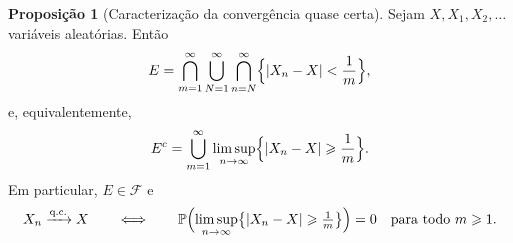 \documentclass[12pt,portuguese]{article}
\theoremstyle{definition}
\newtheorem{proposition}[proposition]{Proposição}
\theoremstyle{plainexercise}
\theoremstyle{starredexercise}
\theoremstyle{definition}
\begin{document}
\begin{proposition}[Caracterização da convergência quase certa]\label{prop:qc-caracterizacao}
Sejam $X,X_1,X_2,\ldots$ variáveis aleatórias. Então
\begin{equation}\label{eq:qc-conjunto}
E
=
\bigcap_{m=1}^{\infty}\bigcup_{N=1}^{\infty}\bigcap_{n=N}^{\infty}
\Bigl\{|X_n-X|<\frac{1}{m}\Bigr\},
\end{equation}
e, equivalentemente,
\begin{equation}\label{eq:qc-limsup}
E^c
=
\bigcup_{m=1}^{\infty}\limsup_{n\to\infty}
\Bigl\{|X_n-X|\geqslant\frac{1}{m}\Bigr\}.
\end{equation}
Em particular, $E\in\mathcal{F}$ e
\[
X_n\xrightarrow{\text{q.c.}}X
\qquad\Longleftrightarrow\qquad
\mathbb{P}\Bigl(\limsup_{n\to\infty}\bigl\{|X_n-X|\geqslant\tfrac{1}{m}\bigr\}\Bigr)=0
\quad\text{para todo }m\geqslant1.
\]
\end{proposition}
\end{document}
